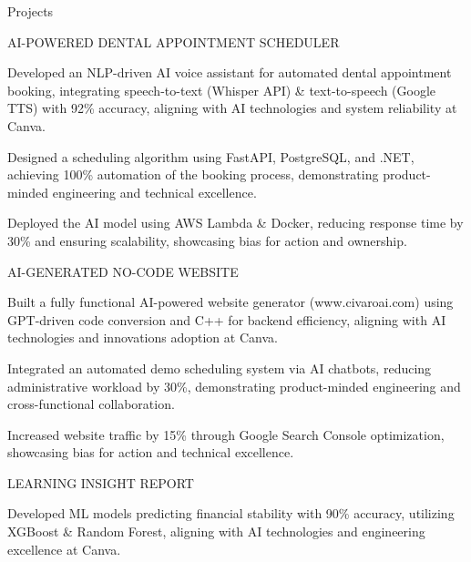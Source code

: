 \documentclass{resume} %
\begin{document}
    \begin{rSection}{Projects}
                    \begin{rSubsection}
                                    {AI{-}POWERED DENTAL APPOINTMENT SCHEDULER}
                                {}{}{}
                                    \item Developed an NLP{-}driven AI voice assistant for automated dental appointment booking, integrating speech{-}to{-}text (Whisper API) \& text{-}to{-}speech (Google TTS) with 92\% accuracy, aligning with AI technologies and system reliability at Canva.
                                    \item Designed a scheduling algorithm using FastAPI, PostgreSQL, and .NET, achieving 100\% automation of the booking process, demonstrating product{-}minded engineering and technical excellence.
                                    \item Deployed the AI model using AWS Lambda \& Docker, reducing response time by 30\% and ensuring scalability, showcasing bias for action and ownership.
                            \end{rSubsection}
                    \begin{rSubsection}
                                    {AI{-}GENERATED NO{-}CODE WEBSITE}
                                {}{}{}
                                    \item Built a fully functional AI{-}powered website generator (www.civaroai.com) using GPT{-}driven code conversion and C++ for backend efficiency, aligning with AI technologies and innovations adoption at Canva.
                                    \item Integrated an automated demo scheduling system via AI chatbots, reducing administrative workload by 30\%, demonstrating product{-}minded engineering and cross{-}functional collaboration.
                                    \item Increased website traffic by 15\% through Google Search Console optimization, showcasing bias for action and technical excellence.
                            \end{rSubsection}
                    \begin{rSubsection}
                                    {LEARNING INSIGHT REPORT}
                                {}{}{}
                                    \item Developed ML models predicting financial stability with 90\% accuracy, utilizing XGBoost \& Random Forest, aligning with AI technologies and engineering excellence at Canva.

\end{rSubsection}
\end{rSection}
\end{document}
